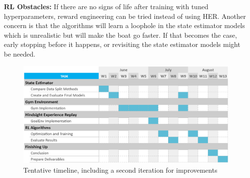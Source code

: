 \textbf{RL Obstacles:} 
If there are no signs of life after training with tuned hyperparameters, reward engineering can be tried instead of using HER. Another concern is that the algorithms will learn a loophole in the state estimator models which is unrealistic but will make the boat go faster. If that becomes the case, early stopping before it happens, or revisiting the state estimator models might be needed.

\begin{figure}[h]
\centering
\includegraphics[width = 0.92\hsize]{figures/gantt-chart2.png}
\caption{Tentative timeline, including a second iteration for improvements}
\label{fig:gantt-chart}
\end{figure}
